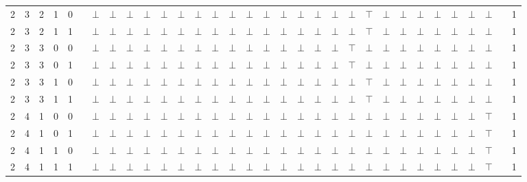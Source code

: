 \documentclass[12pt]{extarticle}
\begin{document}
\begin{landscape}
\begin{tiny}
\begin{longtable}[c]{llllllllllllllllllllllllllllllll}
2 & 3 & 2 & 1 & 0 &  & $\bot$ & $\bot$ & $\bot$ & $\bot$ & $\bot$ & $\bot$ & $\bot$ & $\bot$ & $\bot$ & $\bot$ & $\bot$ & $\bot$ & $\bot$ & $\bot$ & $\bot$ & $\bot$ & $\top$ & $\bot$ & $\bot$ & $\bot$ & $\bot$ & $\bot$ & $\bot$ & $\bot$ &  & 1 \\
2 & 3 & 2 & 1 & 1 &  & $\bot$ & $\bot$ & $\bot$ & $\bot$ & $\bot$ & $\bot$ & $\bot$ & $\bot$ & $\bot$ & $\bot$ & $\bot$ & $\bot$ & $\bot$ & $\bot$ & $\bot$ & $\bot$ & $\top$ & $\bot$ & $\bot$ & $\bot$ & $\bot$ & $\bot$ & $\bot$ & $\bot$ &  & 1 \\
2 & 3 & 3 & 0 & 0 &  & $\bot$ & $\bot$ & $\bot$ & $\bot$ & $\bot$ & $\bot$ & $\bot$ & $\bot$ & $\bot$ & $\bot$ & $\bot$ & $\bot$ & $\bot$ & $\bot$ & $\bot$ & $\top$ & $\bot$ & $\bot$ & $\bot$ & $\bot$ & $\bot$ & $\bot$ & $\bot$ & $\bot$ &  & 1 \\
2 & 3 & 3 & 0 & 1 &  & $\bot$ & $\bot$ & $\bot$ & $\bot$ & $\bot$ & $\bot$ & $\bot$ & $\bot$ & $\bot$ & $\bot$ & $\bot$ & $\bot$ & $\bot$ & $\bot$ & $\bot$ & $\top$ & $\bot$ & $\bot$ & $\bot$ & $\bot$ & $\bot$ & $\bot$ & $\bot$ & $\bot$ &  & 1 \\
2 & 3 & 3 & 1 & 0 &  & $\bot$ & $\bot$ & $\bot$ & $\bot$ & $\bot$ & $\bot$ & $\bot$ & $\bot$ & $\bot$ & $\bot$ & $\bot$ & $\bot$ & $\bot$ & $\bot$ & $\bot$ & $\bot$ & $\top$ & $\bot$ & $\bot$ & $\bot$ & $\bot$ & $\bot$ & $\bot$ & $\bot$ &  & 1 \\
2 & 3 & 3 & 1 & 1 &  & $\bot$ & $\bot$ & $\bot$ & $\bot$ & $\bot$ & $\bot$ & $\bot$ & $\bot$ & $\bot$ & $\bot$ & $\bot$ & $\bot$ & $\bot$ & $\bot$ & $\bot$ & $\bot$ & $\top$ & $\bot$ & $\bot$ & $\bot$ & $\bot$ & $\bot$ & $\bot$ & $\bot$ &  & 1 \\
2 & 4 & 1 & 0 & 0 &  & $\bot$ & $\bot$ & $\bot$ & $\bot$ & $\bot$ & $\bot$ & $\bot$ & $\bot$ & $\bot$ & $\bot$ & $\bot$ & $\bot$ & $\bot$ & $\bot$ & $\bot$ & $\bot$ & $\bot$ & $\bot$ & $\bot$ & $\bot$ & $\bot$ & $\bot$ & $\bot$ & $\top$ &  & 1 \\
2 & 4 & 1 & 0 & 1 &  & $\bot$ & $\bot$ & $\bot$ & $\bot$ & $\bot$ & $\bot$ & $\bot$ & $\bot$ & $\bot$ & $\bot$ & $\bot$ & $\bot$ & $\bot$ & $\bot$ & $\bot$ & $\bot$ & $\bot$ & $\bot$ & $\bot$ & $\bot$ & $\bot$ & $\bot$ & $\bot$ & $\top$ &  & 1 \\
2 & 4 & 1 & 1 & 0 &  & $\bot$ & $\bot$ & $\bot$ & $\bot$ & $\bot$ & $\bot$ & $\bot$ & $\bot$ & $\bot$ & $\bot$ & $\bot$ & $\bot$ & $\bot$ & $\bot$ & $\bot$ & $\bot$ & $\bot$ & $\bot$ & $\bot$ & $\bot$ & $\bot$ & $\bot$ & $\bot$ & $\top$ &  & 1 \\
2 & 4 & 1 & 1 & 1 &  & $\bot$ & $\bot$ & $\bot$ & $\bot$ & $\bot$ & $\bot$ & $\bot$ & $\bot$ & $\bot$ & $\bot$ & $\bot$ & $\bot$ & $\bot$ & $\bot$ & $\bot$ & $\bot$ & $\bot$ & $\bot$ & $\bot$ & $\bot$ & $\bot$ & $\bot$ & $\bot$ & $\top$ &  & 1 \\

\end{longtable}
\end{tiny}
\end{landscape}
\end{document}
